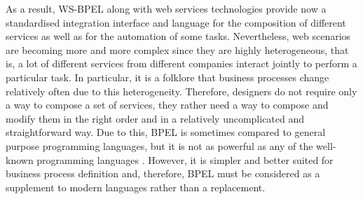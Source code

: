As a result, WS-BPEL along with web services technologies provide now a standardised integration interface 
and language for the composition of different services as well as for the automation of some tasks. 
Nevertheless, web scenarios are becoming more and more complex since they are highly heterogeneous, that is, a lot of different
services from different companies interact jointly to perform a particular task. In particular, it is a folklore 
that business processes change relatively often due to this heterogeneity. Therefore, designers 
do not require only a way to compose a set of services, they rather
need a way to compose and modify them in the right order and in a relatively 
uncomplicated and straightforward way. Due to this, BPEL is sometimes compared 
to general purpose programming languages, but it
is not as powerful as any of the well-known programming languages \cite{BPELsoftcare}. However, 
it is simpler and better suited for business
process definition and, therefore, BPEL must be considered as a supplement to
modern languages rather than a replacement.




